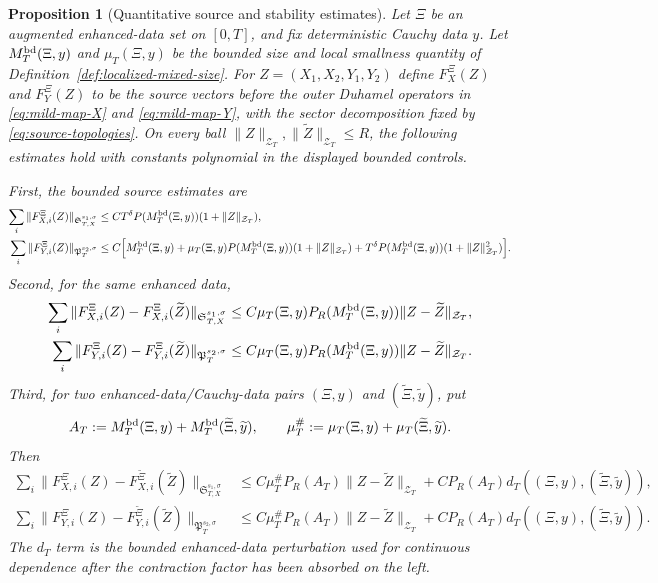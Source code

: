 \documentclass[10pt]{amsart}
\numberwithin{equation}{section}
\theoremstyle{plain}
\newtheorem{proposition}[theorem]{Proposition}
\theoremstyle{definition}
\theoremstyle{remark}
\newcommand{\calZ}{\mathcal{Z}}
\begin{document}
\begin{proposition}[Quantitative source and stability estimates]\label{prop:quantitative-source-stability}
Let $\Xi$ be an augmented enhanced-data set on $[0,T]$, and fix deterministic Cauchy data $y$.  Let $M_T^{\rm bd}(\Xi,y)$ and $\mu_T(\Xi,y)$ be the bounded size and local smallness quantity of Definition~\ref{def:localized-mixed-size}.  For $Z=(X_1,X_2,Y_1,Y_2)$ define $F_X^\Xi(Z)$ and $F_Y^\Xi(Z)$ to be the source vectors before the outer Duhamel operators in \eqref{eq:mild-map-X} and \eqref{eq:mild-map-Y}, with the sector decomposition fixed by \eqref{eq:source-topologies}.  On every ball $\|Z\|_{\calZ_T},\|\widetilde Z\|_{\calZ_T}\le R$, the following estimates hold with constants polynomial in the displayed bounded controls.

First, the bounded source estimates are
\begin{align}
\sum_i\|F_{X,i}^\Xi(Z)\|_{\mathfrak S_{T,X}^{s_1,\sigma}}
&\le C T^\delta P(M_T^{\rm bd}(\Xi,y))(1+\|Z\|_{\calZ_T}),
\label{eq:quant-source-bounded-X}\\
\sum_i\|F_{Y,i}^\Xi(Z)\|_{\mathfrak P_T^{s_2,\sigma}}
&\le C\Bigl[M_T^{\rm bd}(\Xi,y)
      +\mu_T(\Xi,y)P(M_T^{\rm bd}(\Xi,y))(1+\|Z\|_{\calZ_T})
      +T^\delta P(M_T^{\rm bd}(\Xi,y))(1+\|Z\|_{\calZ_T}^2)\Bigr].
\label{eq:quant-source-bounded-Y}
\end{align}
Second, for the same enhanced data,
\begin{align}
\sum_i\|F_{X,i}^\Xi(Z)-F_{X,i}^\Xi(\widetilde Z)\|_{\mathfrak S_{T,X}^{s_1,\sigma}}
&\le C\mu_T(\Xi,y)P_R(M_T^{\rm bd}(\Xi,y))\|Z-\widetilde Z\|_{\calZ_T},
\label{eq:quant-source-contract-X}\\
\sum_i\|F_{Y,i}^\Xi(Z)-F_{Y,i}^\Xi(\widetilde Z)\|_{\mathfrak P_T^{s_2,\sigma}}
&\le C\mu_T(\Xi,y)P_R(M_T^{\rm bd}(\Xi,y))\|Z-\widetilde Z\|_{\calZ_T}.
\label{eq:quant-source-contract-Y}
\end{align}
Third, for two enhanced-data/Cauchy-data pairs $(\Xi,y)$ and $(\widetilde\Xi,\widetilde y)$, put
\[
        A_T:=M_T^{\rm bd}(\Xi,y)+M_T^{\rm bd}(\widetilde\Xi,\widetilde y),
        \qquad
        \mu_T^\#:=\mu_T(\Xi,y)+\mu_T(\widetilde\Xi,\widetilde y).
\]
Then
\begin{align}
\sum_i\|F_{X,i}^\Xi(Z)-F_{X,i}^{\widetilde\Xi}(\widetilde Z)\|_{\mathfrak S_{T,X}^{s_1,\sigma}}
&\le C\mu_T^\#P_R(A_T)\|Z-\widetilde Z\|_{\calZ_T}
     +CP_R(A_T)d_T((\Xi,y),(\widetilde\Xi,\widetilde y)),
\label{eq:quant-source-data-X}\\
\sum_i\|F_{Y,i}^\Xi(Z)-F_{Y,i}^{\widetilde\Xi}(\widetilde Z)\|_{\mathfrak P_T^{s_2,\sigma}}
&\le C\mu_T^\#P_R(A_T)\|Z-\widetilde Z\|_{\calZ_T}
     +CP_R(A_T)d_T((\Xi,y),(\widetilde\Xi,\widetilde y)).
\label{eq:quant-source-data-Y}
\end{align}
The $d_T$ term is the bounded enhanced-data perturbation used for continuous dependence after the contraction factor has been absorbed on the left.
\end{proposition}
\end{document}

